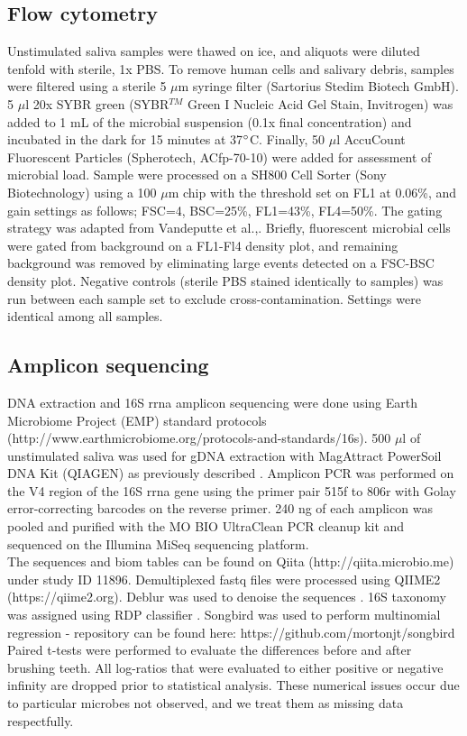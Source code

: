 \subsection{Flow cytometry}
Unstimulated saliva samples were thawed on ice, and aliquots were diluted tenfold with sterile, 1x PBS. To remove human cells and salivary debris, samples were filtered using a sterile 5 $\mu$m syringe filter (Sartorius Stedim Biotech GmbH). 5 $\mu$l 20x SYBR green (SYBR$^{TM}$ Green I Nucleic Acid Gel Stain, Invitrogen) was added to 1 mL of the microbial suspension (0.1x final concentration) and incubated in the dark for 15 minutes at 37$\degree$C.  Finally, 50 $\mu$l AccuCount Fluorescent Particles (Spherotech, AC\gls{fp}-70-10) were added for assessment of microbial load. Sample were processed on a SH800 Cell Sorter (Sony Biotechnology) using a 100 $\mu$m chip with the threshold set on FL1 at 0.06\%, and gain settings as follows; FSC=4, BSC=25\%, FL1=43\%, FL4=50\%. The gating strategy was adapted from Vandeputte et al.,\cite{Vandeputte2017-jl}. Briefly, fluorescent microbial cells were gated from background on a FL1-Fl4 density plot, and remaining background was removed by eliminating large events detected on a FSC-BSC density plot. Negative controls (sterile PBS stained identically to samples) was run between each sample set to exclude cross-contamination. Settings were identical among all samples.\\[5 mm]
%
\subsection{Amplicon sequencing}
DNA extraction and 16S \gls{rrna} amplicon sequencing were done using Earth Microbiome Project (EMP) standard protocols (http://www.earthmicrobiome.org/protocols-and-standards/16s). 500 $\mu$l of unstimulated saliva was used for gDNA extraction with MagAttract PowerSoil DNA Kit (QIAGEN) as previously described \cite{Marotz2017-dy}. Amplicon PCR was performed on the V4 region of the 16S \gls{rrna} gene using the primer pair 515f to 806r with Golay error-correcting barcodes on the reverse primer. 240 ng of each amplicon was pooled and purified with the MO BIO UltraClean PCR cleanup kit and sequenced on the Illumina MiSeq sequencing platform.\\[5 mm]
The sequences and biom tables \cite{McDonald2012-xw} can be found on Qiita (http://qiita.microbio.me) under study ID 11896. Demultiplexed fastq files were processed using QIIME2 (https://qiime2.org)\cite{Caporaso2010-nm}.  Deblur was used to denoise the sequences \cite{Amir2017-zw}.  16S taxonomy was assigned using RDP classifier \cite{Pawlowsky-Glahn2015-qb,Wang2007-gj}. Songbird was used to perform multinomial regression - repository can be found here: https://github.com/mortonjt/songbird\\[5 mm]
Paired t-tests were performed to evaluate the differences before and after brushing teeth.
All log-ratios that were evaluated to either positive or negative infinity are dropped prior to statistical analysis.
These numerical issues occur due to particular microbes not observed, and we treat them as missing data respectfully.
%

